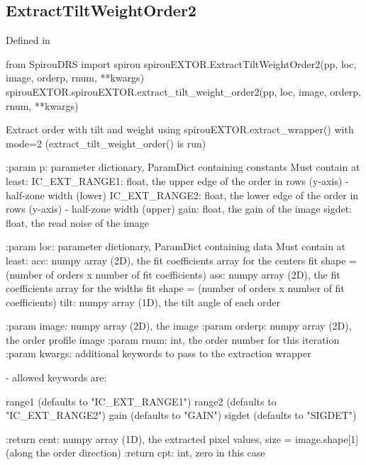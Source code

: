
\begin{minipage}{\textwidth}
\subsection{ExtractTiltWeightOrder2}

Defined in \spirouEXTOR{}

\begin{pythonbox}
from SpirouDRS import spirou
spirouEXTOR.ExtractTiltWeightOrder2(pp, loc, image, orderp, rnum, **kwargs)
spirouEXTOR.spirouEXTOR.extract_tilt_weight_order2(pp, loc, image, orderp, rnum, **kwargs)
\end{pythonbox}

\begin{pythondocstring}
Extract order with tilt and weight using
spirouEXTOR.extract_wrapper() with mode=2
(extract_tilt_weight_order() is run)

:param p: parameter dictionary, ParamDict containing constants
    Must contain at least:
            IC_EXT_RANGE1: float, the upper edge of the order in rows
                           (y-axis) - half-zone width (lower)
            IC_EXT_RANGE2: float, the lower edge of the order in rows
                           (y-axis) - half-zone width (upper)
            gain: float, the gain of the image
            sigdet: float, the read noise of the image

:param loc: parameter dictionary, ParamDict containing data
        Must contain at least:
            acc: numpy array (2D), the fit coefficients array for
                  the centers fit
                  shape = (number of orders x number of fit coefficients)
            ass: numpy array (2D), the fit coefficients array for
                  the widths fit
                  shape = (number of orders x number of fit coefficients)
            tilt: numpy array (1D), the tilt angle of each order

:param image: numpy array (2D), the image
:param orderp: numpy array (2D), the order profile image
:param rnum: int, the order number for this iteration
:param kwargs: additional keywords to pass to the extraction wrapper

        - allowed keywords are:

        range1  (defaults to "IC_EXT_RANGE1")
        range2  (defaults to "IC_EXT_RANGE2")
        gain    (defaults to "GAIN")
        sigdet  (defaults to "SIGDET")

:return cent: numpy array (1D), the extracted pixel values,
             size = image.shape[1] (along the order direction)
:return cpt: int, zero in this case
\end{pythondocstring}
\end{minipage}

